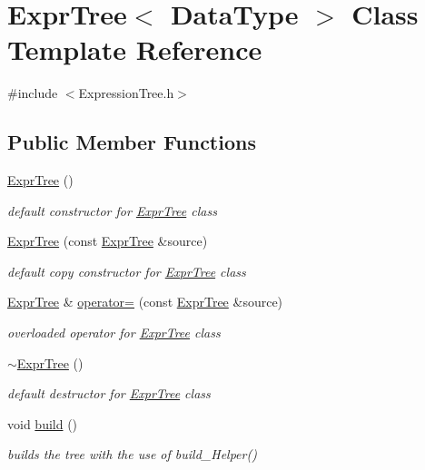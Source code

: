 \hypertarget{class_expr_tree}{}\section{Expr\+Tree$<$ Data\+Type $>$ Class Template Reference}
\label{class_expr_tree}


{\ttfamily \#include $<$Expression\+Tree.\+h$>$}

\subsection*{Public Member Functions}
\begin{DoxyCompactItemize}
\item 
\hyperlink{class_expr_tree_a1d5004443b461637bcb0fe0a86759d50}{Expr\+Tree} ()
\begin{DoxyCompactList}\small\item\em default constructor for \hyperlink{class_expr_tree}{Expr\+Tree} class \end{DoxyCompactList}\item 
\hyperlink{class_expr_tree_aeec9dc6139cf32fcc911840bab438239}{Expr\+Tree} (const \hyperlink{class_expr_tree}{Expr\+Tree} \&source)
\begin{DoxyCompactList}\small\item\em default copy constructor for \hyperlink{class_expr_tree}{Expr\+Tree} class \end{DoxyCompactList}\item 
\hyperlink{class_expr_tree}{Expr\+Tree} \& \hyperlink{class_expr_tree_a9a7b2120af2c2df666b1154eec20008a}{operator=} (const \hyperlink{class_expr_tree}{Expr\+Tree} \&source)
\begin{DoxyCompactList}\small\item\em overloaded operator for \hyperlink{class_expr_tree}{Expr\+Tree} class \end{DoxyCompactList}\item 
\hyperlink{class_expr_tree_a8976e9af7e1209b9db475b863ab9f31d}{$\sim$\+Expr\+Tree} ()
\begin{DoxyCompactList}\small\item\em default destructor for \hyperlink{class_expr_tree}{Expr\+Tree} class \end{DoxyCompactList}\item 
void \hyperlink{class_expr_tree_a283a61049eb163f6f370d562cc92c824}{build} ()
\begin{DoxyCompactList}\small\item\em builds the tree with the use of build\+\_\+\+Helper() \end{DoxyCompactList}\item 

\end{DoxyCompactItemize}
